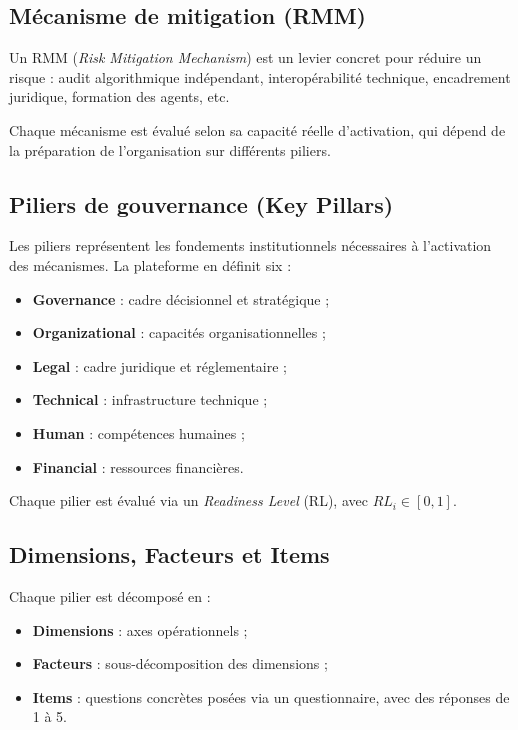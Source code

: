 \subsection{Mécanisme de mitigation (RMM)}
Un RMM (\textit{Risk Mitigation Mechanism}) est un levier concret pour réduire un risque : audit algorithmique indépendant, interopérabilité technique, encadrement juridique, formation des agents, etc.

Chaque mécanisme est évalué selon sa capacité réelle d'activation, qui dépend de la préparation de l'organisation sur différents piliers.

\subsection{Piliers de gouvernance (Key Pillars)}
Les piliers représentent les fondements institutionnels nécessaires à l'activation des mécanismes. La plateforme en définit six :
\begin{itemize}
    \item \textbf{Governance} : cadre décisionnel et stratégique ;
    \item \textbf{Organizational} : capacités organisationnelles ;
    \item \textbf{Legal} : cadre juridique et réglementaire ;
    \item \textbf{Technical} : infrastructure technique ;
    \item \textbf{Human} : compétences humaines ;
    \item \textbf{Financial} : ressources financières.
\end{itemize}

Chaque pilier est évalué via un \textit{Readiness Level} (RL), avec $RL_i \in [0, 1]$.

\subsection{Dimensions, Facteurs et Items}
Chaque pilier est décomposé en :
\begin{itemize}
    \item \textbf{Dimensions} : axes opérationnels ;
    \item \textbf{Facteurs} : sous-décomposition des dimensions ;
    \item \textbf{Items} : questions concrètes posées via un questionnaire, avec des réponses de 1 à 5.
\end{itemize}

